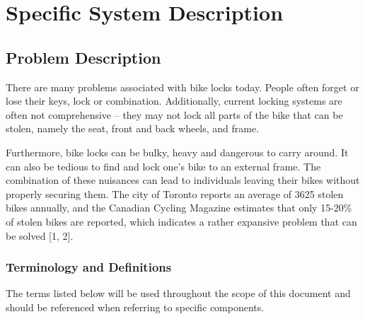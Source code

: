\documentclass[12pt]{article}
\begin{document}
\section{Specific System Description}


\subsection{Problem Description} \label{Sec_pd}

There are many problems associated with bike locks today.  People often forget or lose their keys, lock or combination.  Additionally, current locking systems are often not comprehensive – they may not lock all parts of the bike that can be stolen, namely the seat, front and back wheels, and frame.  


Furthermore, bike locks can be bulky, heavy and dangerous to carry around. It can also be tedious to find and lock one’s bike to an external frame.  The combination of these nuisances can lead to individuals leaving their bikes without properly securing them.  The city of Toronto reports an average of 3625 stolen bikes annually, and the Canadian Cycling Magazine estimates that only 15-20\% of stolen bikes are reported, which indicates a rather expansive problem that can be solved [1, 2]. 

\subsubsection{Terminology and  Definitions}

The terms listed below will be used throughout the scope of this document and should be referenced when referring to specific components.  
\end{document}
